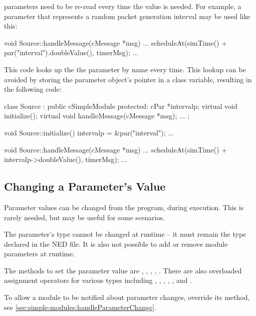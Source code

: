  parameters need to be re-read every time the value is needed.
For example, a parameter that represents a random packet generation interval
may be used like this:

\begin{cpp}
void Source::handleMessage(cMessage *msg)
{
    ...
    scheduleAt(simTime() + par("interval").doubleValue(), timerMsg);
    ...
}
\end{cpp}

This code looks up the the parameter by name every time. This lookup
can be avoided by storing the parameter object's pointer in a class variable,
resulting in the following code:

\begin{cpp}
class Source : public cSimpleModule
{
  protected:
    cPar *intervalp;
    virtual void initialize();
    virtual void handleMessage(cMessage *msg);
    ...
};

void Source::initialize()
{
    intervalp = &par("interval");
    ...
}

void Source::handleMessage(cMessage *msg)
{
    ...
    scheduleAt(simTime() + intervalp->doubleValue(), timerMsg);
    ...
}
\end{cpp}


\subsection{Changing a Parameter's Value}
\label{sec:simple-modules:setting-parameters}

Parameter values can be changed from the program, during execution.
This is rarely needed, but may be useful for some scenarios.

\begin{note}
    The parameter's type cannot be changed at runtime -- it must
    remain the type declared in the NED file. It is also not possible
    to add or remove module parameters at runtime.
\end{note}

The methods to set the parameter value are ,
, ,
, . There are also
overloaded assignment operators for various types including ,
, , , , and
.

To allow a module to be notified about parameter changes, override
its  method, see
\ref{sec:simple-modules:handleParameterChange}.


